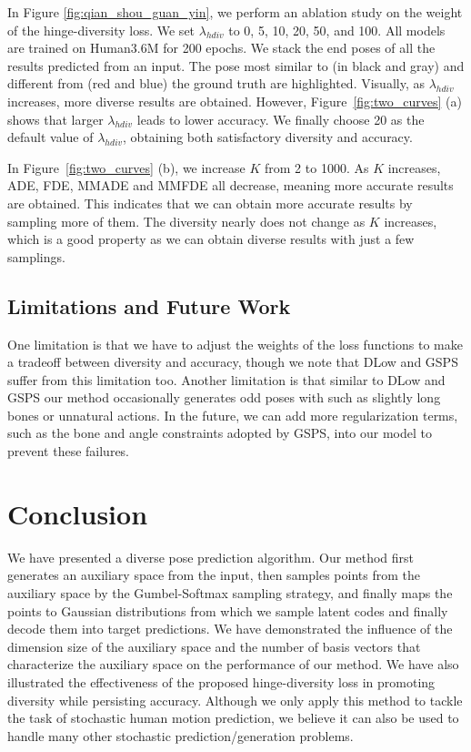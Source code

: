 \documentclass[sigconf,screen,nonacm]{acmart}
\begin{document}
	In Figure \ref{fig:qian_shou_guan_yin}, we perform an ablation study on the weight of the hinge-diversity loss. We set $\lambda_{hdiv}$ to 0, 5, 10, 20, 50, and 100. All models are trained on Human3.6M for 200 epochs. We stack the end poses of all the results predicted from an input. The pose most similar to (in black and gray) and different from (red and blue) the ground truth are highlighted. Visually, as $\lambda_{hdiv}$ increases, more diverse results are obtained. However, Figure~\ref{fig:two_curves} (a) shows that larger $\lambda_{hdiv}$ leads to lower accuracy. We finally choose 20 as the default value of $\lambda_{hdiv}$, obtaining both satisfactory diversity and accuracy.
	
	In Figure~\ref{fig:two_curves} (b), we increase $K$ from 2 to 1000. As $K$ increases, ADE, FDE, MMADE and MMFDE all decrease, meaning more accurate results are obtained. This indicates that we can obtain more accurate results by sampling more of them. The diversity nearly does not change as $K$ increases, which is a good property as we can obtain diverse results with just a few samplings.
	


	\subsection{Limitations and Future Work}
	One limitation is that we have to adjust the weights of the loss functions to make a tradeoff between diversity and accuracy, though we note that DLow and GSPS suffer from this limitation too. Another limitation is that similar to DLow and GSPS our method occasionally generates odd poses with such as slightly long bones or unnatural actions. In the future, we can add more regularization terms, such as the bone and angle constraints adopted by GSPS, into our model to prevent these failures.
	
	\section{Conclusion}
	We have presented a diverse pose prediction algorithm. Our method first generates an auxiliary space from the input, then samples points from the auxiliary space by the Gumbel-Softmax sampling strategy, and finally maps the points to Gaussian distributions from which we sample latent codes and finally decode them into target predictions. We have demonstrated the influence of the dimension size of the auxiliary space and the number of basis vectors that characterize the auxiliary space on the performance of our method. We have also illustrated the effectiveness of the proposed hinge-diversity loss in promoting diversity while persisting accuracy. Although we only apply this method to tackle the task of stochastic human motion prediction, we believe it can also be used to handle many other stochastic prediction/generation problems.
	
\end{document}
